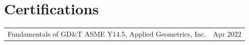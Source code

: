 \section{\sc Certifications}

\begin{tabular}{@{}p{5in}p{2in}}
Fundamentals of GD\&T ASME Y14.5, Applied Geometrics, Inc. & Apr 2022\\
\end{tabular}

\endinput